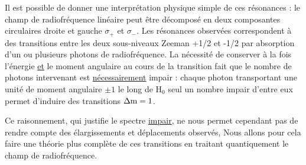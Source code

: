 Il est possible de donner une interprétation physique simple de ces
résonances : le champ de radiofréquence linéaire peut être décomposé en deux
composantes circulaires droite et gauche $\sigma_+$ et $\sigma_-$. Les résonances observées correspondent
à des transitions entre les deux sous-niveaux Zeeman +1/2 et -1/2
par absorption d'un ou plusieurs photons de radiofréquence. La nécessité de
conserver à la fois l'énergie \ul{et} le moment angulaire au cours de la transition
fait que le nombre de photons intervenant est \ul{nécessairement} impair : chaque
photon transportant une unité de moment angulaire $\pm1$ le long de H$_0$ seul un
nombre impair d'entre eux permet d'induire des transitions $\Delta\text{m}=1$.

\begin{minipage}[c]{.45\linewidth}
\begin{center}  \end{center}
\end{minipage}
\hfill
\begin{minipage}[c]{.45\linewidth}
\begin{center}  \end{center}
\end{minipage}

Ce raisonnement, qui justifie le spectre \ul{impair}, ne nous permet cependant pas
de rendre compte des élargissements et déplacements observés, Nous allons pour
cela faire une théorie plus complète de ces transitions en traitant quantiquement le champ de radiofréquence.

